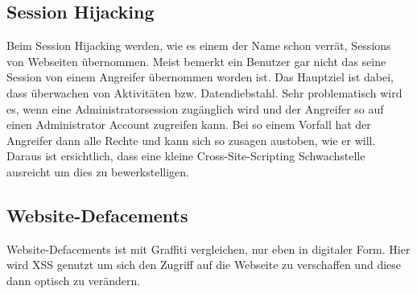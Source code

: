\subsection{Session Hijacking}
\label{sec:xss_session_hijacking}
Beim Session Hijacking werden, wie es einem der Name schon verrät, Sessions von Webseiten übernommen. Meist bemerkt ein Benutzer gar nicht das seine Session von einem Angreifer übernommen worden ist. Das Hauptziel ist dabei, dass überwachen von Aktivitäten bzw. Datendiebstahl. Sehr problematisch wird es, wenn eine Administratorsession zugänglich wird und der Angreifer so auf einen Administrator Account zugreifen kann. Bei so einem Vorfall hat der Angreifer dann alle Rechte und kann sich so zusagen austoben, wie er will. Daraus ist ersichtlich, dass eine kleine Cross-Site-Scripting Schwachstelle ausreicht um dies zu bewerkstelligen. 
\subsection{Website-Defacements}
\label{sec:xss_web_def}
Website-Defacements ist mit Graffiti vergleichen, nur eben in digitaler Form. Hier wird XSS genutzt um sich den Zugriff auf die Webseite zu verschaffen und diese dann optisch zu verändern. 
